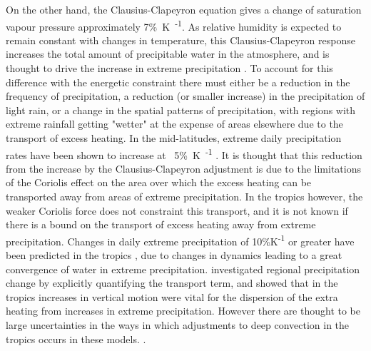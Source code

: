 On the other hand, the Clausius-Clapeyron equation gives a change of saturation vapour pressure approximately 7\%\SI{}{\kelvin\textsuperscript{-1}}.
As relative humidity is expected to remain constant with changes in temperature, this Clausius-Clapeyron response increases the total amount of precipitable water in the atmosphere, and is thought to drive the increase in extreme precipitation \citep{ogorman_precipitation_2015}.
To account for this difference with the energetic constraint there must either be a reduction in the frequency of precipitation, a reduction (or smaller increase) in the precipitation of light rain, or a change in the spatial patterns of precipitation, with regions with extreme rainfall getting "wetter" at the expense of areas elsewhere due to the transport of excess heating.
In the mid-latitudes, extreme daily precipitation rates have been shown to increase at ~5\%\SI{}{\kelvin\textsuperscript{-1}} \citep{ogorman_physical_2009}.
It is thought that this reduction from the increase by the Clausius-Clapeyron adjustment is due to the limitations of the Coriolis effect on the area over which the excess heating can be transported away from areas of extreme precipitation.
In the tropics however, the weaker Coriolis force does not constraint this transport, and it is not known if there is a bound on the transport of excess heating away from extreme precipitation.
Changes in daily extreme precipitation of 10\%K\textsuperscript{-1} or greater have been predicted in the tropics \citep{ogorman_energetic_2012}, due to changes in dynamics leading to a great convergence of water in extreme precipitation.
\citet{muller_energetic_2011} investigated regional precipitation change by explicitly quantifying the transport term, and showed that in the tropics increases in vertical motion were vital for the dispersion of the extra heating from increases in extreme precipitation.
However there are thought to be large uncertainties in the ways in which adjustments to deep convection in the tropics occurs in these models. \citep{westra_future_2014}.

